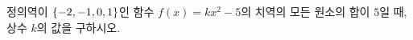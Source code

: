 정의역이 $\{-2{,}\mkern3mu\mathopen{}-1{,}\mkern3mu\mathopen{}0{,}\mkern3mu\mathopen{}1\}$인 함수 $f(x)=kx^2-5$의 치역의 모든 원소의 합이 $5$일 때, 상수 $k$의 값을 구하시오.
